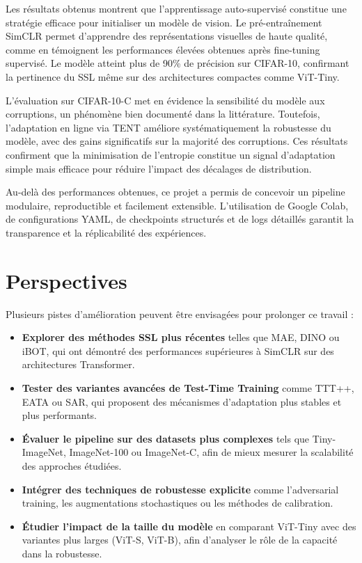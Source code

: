 \documentclass[12pt,a4paper]{report}
\begin{document}
	Les résultats obtenus montrent que l’apprentissage auto-supervisé constitue une stratégie efficace pour initialiser un modèle de vision. Le pré-entraînement SimCLR permet d’apprendre des représentations visuelles de haute qualité, comme en témoignent les performances élevées obtenues après fine-tuning supervisé. Le modèle atteint plus de 90\% de précision sur CIFAR-10, confirmant la pertinence du SSL même sur des architectures compactes comme ViT-Tiny.
	
	L’évaluation sur CIFAR-10-C met en évidence la sensibilité du modèle aux corruptions, un phénomène bien documenté dans la littérature. Toutefois, l’adaptation en ligne via TENT améliore systématiquement la robustesse du modèle, avec des gains significatifs sur la majorité des corruptions. Ces résultats confirment que la minimisation de l’entropie constitue un signal d’adaptation simple mais efficace pour réduire l’impact des décalages de distribution.
	
	Au-delà des performances obtenues, ce projet a permis de concevoir un pipeline modulaire, reproductible et facilement extensible. L’utilisation de Google Colab, de configurations YAML, de checkpoints structurés et de logs détaillés garantit la transparence et la réplicabilité des expériences.
	
	\section*{Perspectives}
	
	Plusieurs pistes d’amélioration peuvent être envisagées pour prolonger ce travail :
	
	\begin{itemize}
		\item \textbf{Explorer des méthodes SSL plus récentes} telles que MAE, DINO ou iBOT, qui ont démontré des performances supérieures à SimCLR sur des architectures Transformer.
		\item \textbf{Tester des variantes avancées de Test-Time Training} comme TTT++, EATA ou SAR, qui proposent des mécanismes d’adaptation plus stables et plus performants.
		\item \textbf{Évaluer le pipeline sur des datasets plus complexes} tels que Tiny-ImageNet, ImageNet-100 ou ImageNet-C, afin de mieux mesurer la scalabilité des approches étudiées.
		\item \textbf{Intégrer des techniques de robustesse explicite} comme l’adversarial training, les augmentations stochastiques ou les méthodes de calibration.
		\item \textbf{Étudier l’impact de la taille du modèle} en comparant ViT-Tiny avec des variantes plus larges (ViT-S, ViT-B), afin d’analyser le rôle de la capacité dans la robustesse.
	\end{itemize}
	
\end{document}
